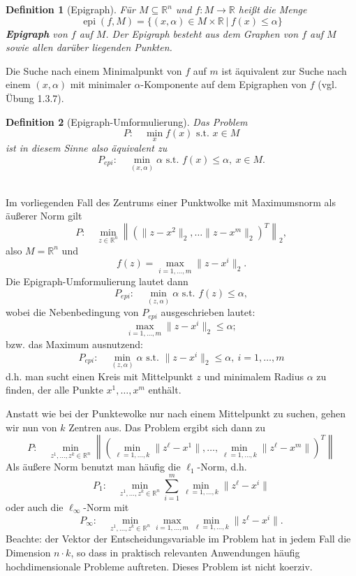 \documentclass[12pt]{extreport} %
\newcommand{\R}{\mathbb{R}}
\theoremstyle{named}
\theoremstyle{nnamed}
\theoremstyle{itshape}
\newtheorem*{definition}{Definition}
\theoremstyle{normal}
\begin{document}
\begin{definition}[Epigraph]
	Für $M \subseteq \R^n$ und $f \colon M \rightarrow \R$ heißt die Menge
	$$ \operatorname{epi}(f, M) = \big\{ (x, \alpha) \in M \times \R ~|~ f(x) \leq \alpha \big\} $$
	\textbf{Epigraph} von $f$ auf $M$. Der Epigraph besteht aus dem Graphen von $f$ auf $M$ sowie allen darüber liegenden Punkten.
\end{definition}

Die Suche nach einem Minimalpunkt von $f$ auf $m$ ist äquivalent zur Suche nach einem $(x, \alpha)$ mit minimaler $\alpha$-Komponente auf dem Epigraphen von $f$ (vgl. Übung 1.3.7). %

\begin{definition}[Epigraph-Umformulierung]
	Das Problem 
		$$ P: \quad \min_x f(x) \text{ s.t. } x \in M $$
	ist in diesem Sinne also äquivalent zu
		$$ P_{epi}: \quad \min_{(x, \alpha)} \alpha \text{ s.t. } f(x) \leq \alpha, ~x \in M. $$
\end{definition}

\begin{beispiel} ~\\
	Im vorliegenden Fall des Zentrums einer Punktwolke mit Maximumsnorm als äußerer Norm gilt
		$$ P: \quad \min_{z \in \R^n} \left\| \left( \| z - x^2 \|_2, \dotsc \| z - x^m \|_2 \right)^T \right\|_2, $$
	also $M = \R^n$ und 
		$$ f(z) = \max_{i=1, \dotsc, m} \| z - x^i \|_2. $$
	Die Epigraph-Umformulierung lautet dann
		$$ P_{epi}: \quad \min_{(z, \alpha)} \alpha \text{ s.t. } f(z) \leq \alpha, $$
	wobei die Nebenbedingung von $P_{epi}$ ausgeschrieben lautet:
	$$ \max_{i=1, \dotsc, m} \| z - x^i \|_2 \leq \alpha; $$
	bzw. das Maximum ausnutzend:
	$$ P_{epi}: \quad \min_{(z, \alpha)} \alpha \text{ s.t. } \| z - x^i \|_2 \leq \alpha, ~ i = 1, \dotsc, m $$
	d.h. man sucht einen Kreis mit Mittelpunkt $z$ und minimalem Radius $\alpha$ zu finden, der alle Punkte $x^1, \dotsc, x^m$ enthält.
\end{beispiel}

\begin{beispiel}[1.1.6, 1.2.27, Clusteranalyse]
	Anstatt wie bei der Punktewolke nur nach einem Mittelpunkt zu suchen, gehen wir nun von $k$ Zentren aus. Das Problem ergibt sich dann zu
	$$ P: \quad \min_{z^1, \dotsc, z^k \in \R^n} \left\| \left( \min_{\ell = 1, \dotsc, k} \| z^{\ell} - x^1 \|, \dotsc, \min_{\ell = 1, \dotsc, k} \| z^\ell - x^m \| \right)^T \right\| $$ 
	Als äußere Norm benutzt man häufig die $\ell_1$-Norm, d.h.
	$$ P_1: \quad \min_{z^1, \dotsc, z^k \in \R^n} \sum_{i=1}^{m} \min_{\ell = 1, \dotsc, k} \| z^\ell - x^i \| $$
	oder auch die $\ell_\infty$-Norm mit
	$$ P_\infty: \quad \min_{z^1, \dotsc, z^k \in \R^n} \max_{i=1, \dotsc, m} \min_{\ell = 1, \dotsc, k} \| z^\ell - x^i \|. $$	
	Beachte: der Vektor der Entscheidungsvariable im Problem hat in jedem Fall die Dimension $n \cdot k$, so dass in praktisch relevanten Anwendungen häufig hochdimensionale Probleme auftreten. Dieses Problem ist nicht koerziv.
\end{beispiel}
\end{document}
